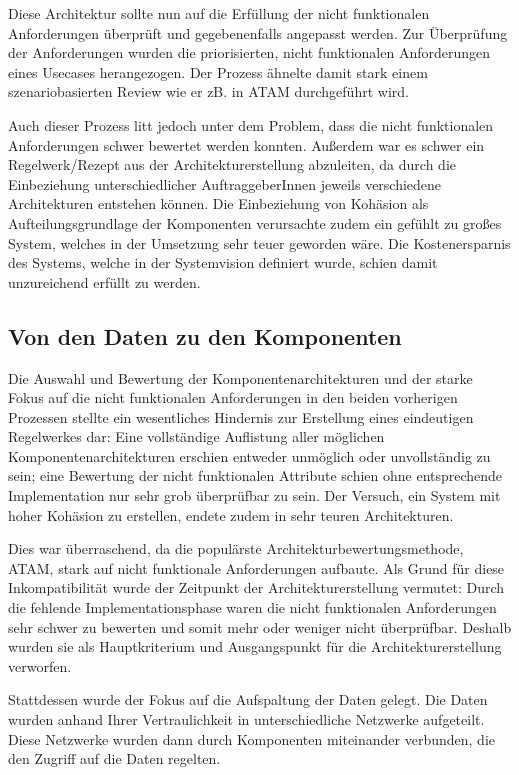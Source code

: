 Diese Architektur sollte nun auf die Erfüllung der nicht funktionalen Anforderungen überprüft und gegebenenfalls angepasst werden. Zur Überprüfung der Anforderungen wurden die priorisierten, nicht funktionalen Anforderungen eines Usecases herangezogen. Der Prozess ähnelte damit stark einem szenariobasierten Review wie er zB. in ATAM durchgeführt wird.

Auch dieser Prozess litt jedoch unter dem Problem, dass die nicht funktionalen Anforderungen schwer bewertet werden konnten. Außerdem war es schwer ein Regelwerk/Rezept aus der Architekturerstellung abzuleiten, da durch die Einbeziehung unterschiedlicher AuftraggeberInnen jeweils verschiedene Architekturen entstehen können. Die Einbeziehung von Kohäsion als Aufteilungsgrundlage der Komponenten verursachte zudem ein gefühlt zu großes System, welches in der Umsetzung sehr teuer geworden wäre. Die Kostenersparnis des Systems, welche in der Systemvision definiert wurde, schien damit unzureichend erfüllt zu werden.

\subsection{Von den Daten zu den Komponenten}
Die Auswahl und Bewertung der Komponentenarchitekturen und der starke Fokus auf die nicht funktionalen Anforderungen in den beiden vorherigen Prozessen stellte ein wesentliches Hindernis zur Erstellung eines eindeutigen Regelwerkes dar: Eine vollständige Auflistung aller möglichen Komponentenarchitekturen erschien entweder unmöglich oder unvollständig zu sein; eine Bewertung der nicht funktionalen Attribute schien ohne entsprechende Implementation nur sehr grob überprüfbar zu sein. Der Versuch, ein System mit hoher Kohäsion zu erstellen, endete zudem in sehr teuren Architekturen.

Dies war überraschend, da die populärste Architekturbewertungsmethode, ATAM, stark auf nicht funktionale Anforderungen aufbaute. Als Grund für diese Inkompatibilität wurde der Zeitpunkt der Architekturerstellung vermutet: Durch die fehlende Implementationsphase waren die nicht funktionalen Anforderungen sehr schwer zu bewerten und somit mehr oder weniger nicht überprüfbar. Deshalb wurden sie als Hauptkriterium und Ausgangspunkt für die Architekturerstellung verworfen.

Stattdessen wurde der Fokus auf die Aufspaltung der Daten gelegt. Die Daten wurden anhand Ihrer Vertraulichkeit in unterschiedliche Netzwerke aufgeteilt. Diese Netzwerke wurden dann durch Komponenten miteinander verbunden, die den Zugriff auf die Daten regelten.

